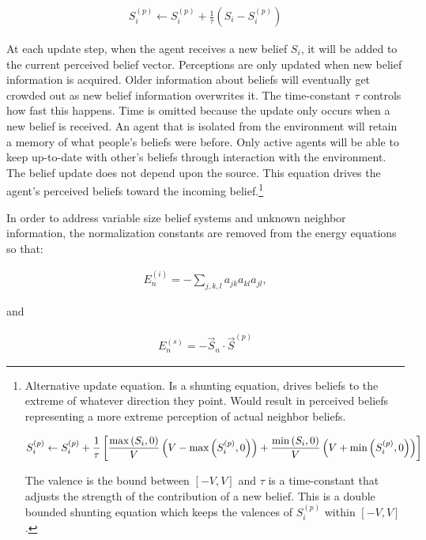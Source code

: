 \documentclass[11pt, a4paper]{article}
\begin{document}
\begin{eqnarray}
S_i^{(p)}\leftarrow S_i^{(p)} + \frac{1}{\tau}\left ( S_i -  S_i^{(p)} \right)
\end{eqnarray}

At each update step, when the agent receives a new belief $S_i$, it will be added to the current perceived belief vector. Perceptions are only updated when new belief information is acquired. Older information about beliefs will eventually get crowded out as new belief information overwrites it. The time-constant $\tau$ controls how fast this happens. Time is omitted because the update only occurs when a new belief is received. An agent that is isolated from the environment will retain a memory of what people's beliefs were before. Only active agents will be able to keep up-to-date with other's beliefs through interaction with the environment. The belief update does not depend upon the source. This equation drives the agent's perceived beliefs toward the incoming belief.\footnote{Alternative update equation. Is a shunting equation, drives beliefs to the extreme of whatever direction they point. Would result in perceived beliefs representing a more extreme perception of actual neighbor beliefs.

\begin{eqnarray}
S_i^{(p)}\leftarrow S_i^{(p)} + \frac{1}{\tau}\left [ \frac{\textup{max}\left( S_i,0 \right )}{V} \left( V - \textup{max}\left( S_i^{(p)},0\right ) \right ) + \frac{\textup{min}\left( S_i,0 \right )}{V} \left( V + \textup{min}\left( S_i^{(p)},0\right ) \right )\right ]
\end{eqnarray}

The valence is the bound between $[-V,V]$ and $\tau$ is a time-constant that adjusts the strength of the contribution of a new belief. This is a double bounded shunting equation which keeps the valences of $S_i^{(p)}$ within $[-V,V]$.}

In order to address variable size belief systems and unknown neighbor information, the normalization constants are removed from the energy equations so that:

\begin{eqnarray}
E_n^{(i)} = -\sum_{j,k,l} a_{jk} a_{kl} a_{jl}, 
\end{eqnarray}

and 

\begin{eqnarray}
E_n^{(s)}=-\vec{S}_n \cdot \vec{S}^{(p)}
\end{eqnarray}
\end{document}
